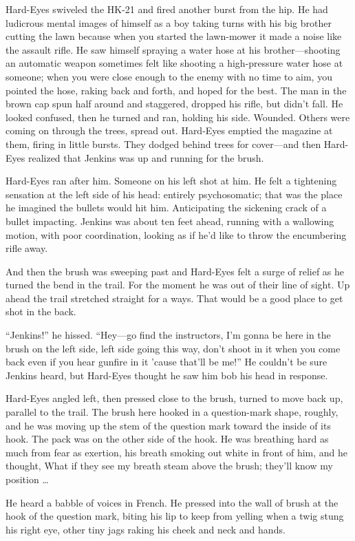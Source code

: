 Hard-Eyes swiveled the HK-21 and fired another burst from the hip. He had ludicrous mental images of himself as a boy taking turns with his big brother cutting the lawn because when you started the lawn-mower it made a noise like the assault rifle. He saw himself spraying a water hose at his brother—shooting an automatic weapon sometimes felt like shooting a high-pressure water hose at someone; when you were close enough to the enemy with no time to aim, you pointed the hose, raking back and forth, and hoped for the best. The man in the brown cap spun half around and staggered, dropped his rifle, but didn’t fall. He looked confused, then he turned and ran, holding his side. Wounded. Others were coming on through the trees, spread out. Hard-Eyes emptied the magazine at them, firing in little bursts. They dodged behind trees for cover—and then Hard-Eyes realized that Jenkins was up and running for the brush.

Hard-Eyes ran after him. Someone on his left shot at him. He felt a tightening sensation at the left side of his head: entirely psychosomatic; that was the place he imagined the bullets would hit him. Anticipating the sickening crack of a bullet impacting. Jenkins was about ten feet ahead, running with a wallowing motion, with poor coordination, looking as if he’d like to throw the encumbering rifle away.

And then the brush was sweeping past and Hard-Eyes felt a surge of relief as he turned the bend in the trail. For the moment he was out of their line of sight. Up ahead the trail stretched straight for a ways. That would be a good place to get shot in the back.

“Jenkins!” he hissed. “Hey—go find the instructors, I’m gonna be here in the brush on the left side, left side going this way, don’t shoot in it when you come back even if you hear gunfire in it ’cause that’ll be me!” He couldn’t be sure Jenkins heard, but Hard-Eyes thought he saw him bob his head in response.

Hard-Eyes angled left, then pressed close to the brush, turned to move back up, parallel to the trail. The brush here hooked in a question-mark shape, roughly, and he was moving up the stem of the question mark toward the inside of its hook. The pack was on the other side of the hook. He was breathing hard as much from fear as exertion, his breath smoking out white in front of him, and he thought, What if they see my breath steam above the brush; they’ll know my position …

He heard a babble of voices in French. He pressed into the wall of brush at the hook of the question mark, biting his lip to keep from yelling when a twig stung his right eye, other tiny jags raking his cheek and neck and hands.

